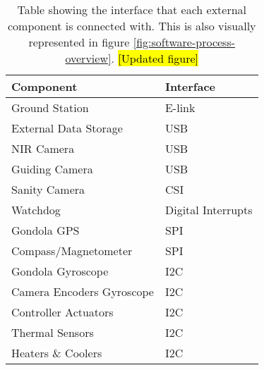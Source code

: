 \begin{table}[H]
	\centering
	\begin{tabular}{l|l}
		\textbf{Component}
		& \textbf{Interface} \\ \hline
		Ground Station
		& E-link             \\
		External Data Storage
		& USB            	 \\
		NIR Camera
		& USB                \\
		Guiding Camera
		& USB                \\
		Sanity Camera
		& CSI                \\
		Watchdog
		& Digital Interrupts \\
		Gondola GPS
		& SPI                \\
		Compass/Magnetometer
		& SPI                \\
		Gondola Gyroscope
		& I2C                \\
		Camera Encoders Gyroscope
		& I2C                \\
		Controller Actuators
		& I2C                \\
		Thermal Sensors
		& I2C				 \\
		Heaters \& Coolers
		& I2C
	\end{tabular}
	\caption{Table showing the interface that each external component is connected with. This is also visually represented in figure \ref{fig:software-process-overview}. \hl{[Updated figure]}}
	\label{tab:software-interfaces}
\end{table}

